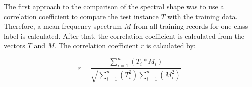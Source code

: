 

The first approach to the comparison of the spectral shape was to use a correlation coefficient to compare the test instance $T$ with the training data. Therefore, a mean frequency spectrum $M$ from all training records for one class label is calculated. After that, the correlation coefficient is calculated from the vectors $T$ and $M$. The correlation coefficient $r$ is calculated by:

\begin{equation}
\label{eq:correlationcoefficient}
	r = \frac{\sum_{i=1}^{n}{(T_i * M_i)}}{\sqrt{\sum_{i=1}^{n}{(T_i^2)}\sum_{i=1}^{n}{(M_i^2)}}}
\end{equation}

